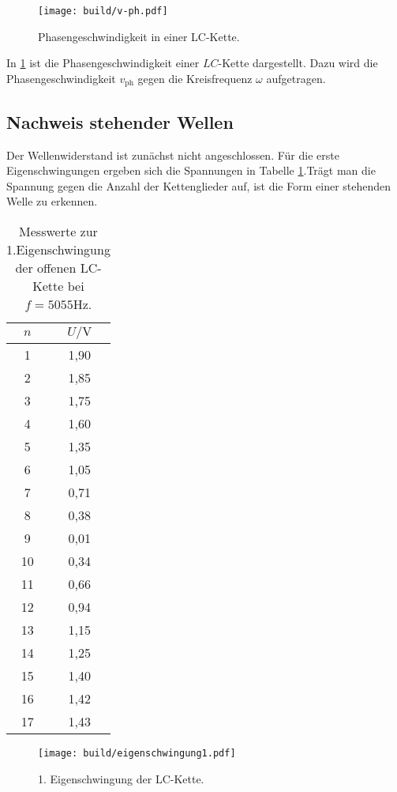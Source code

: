 \begin{figure}
  \centering
  \texttt{[image: build/v-ph.pdf]}
\caption{Phasengeschwindigkeit in einer LC-Kette.}
  \label{fig:v-ph}
\end{figure}

In \ref{fig:v-ph} ist die Phasengeschwindigkeit einer $LC$-Kette dargestellt. Dazu wird die Phasengeschwindigkeit $v_\mathrm{ph}$ gegen die Kreisfrequenz $\omega$ aufgetragen.

\subsection{Nachweis stehender Wellen}

Der Wellenwiderstand ist zunächst nicht angeschlossen. Für die erste Eigenschwingungen ergeben sich die Spannungen in Tabelle \ref{tab:eigenschwingung1}.Trägt man die Spannung gegen die Anzahl der Kettenglieder auf, ist die Form einer stehenden Welle zu erkennen.
\begin{table}
  \centering
  \caption{Messwerte zur 1.Eigenschwingung der offenen LC-Kette bei $f = 5055 \si{\Hz}$.}
  \label{tab:eigenschwingung1}
  \begin{tabular}{c c}
    \toprule
    $n$ & $U / \si{\volt}$ \\
\midrule
1 & 1,90 \\
2 & 1,85 \\
3 & 1,75 \\
4 & 1,60 \\
5 & 1,35 \\
6 & 1,05 \\
7 & 0,71 \\
8 & 0,38 \\
9 & 0,01 \\
10 & 0,34 \\
11 & 0,66 \\
12 & 0,94 \\
13 & 1,15 \\
14 & 1,25 \\
15 & 1,40 \\
16 & 1,42 \\
17 & 1,43 \\
\bottomrule
\end{tabular}
\end{table}

\begin{figure}
  \centering
  \texttt{[image: build/eigenschwingung1.pdf]}
\caption{1. Eigenschwingung der LC-Kette.}
  \label{fig:eigenschwingung1}
\end{figure}

